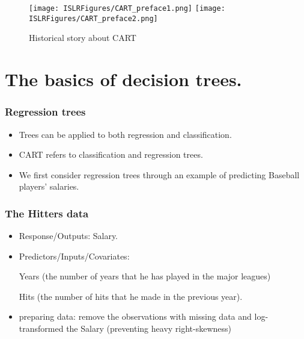 \documentclass{beamer}
\begin{document}
                \begin{frame}{}

                    \begin{figure}
              \centering
                \texttt{[image: ISLRFigures/CART\_preface1.png]}\quad
                \texttt{[image: ISLRFigures/CART\_preface2.png]}
              \caption{Historical story about CART}
            \end{figure}

        \end{frame}
        
\section{The basics of decision trees.}        
       \begin{frame}
       	\frametitle{Regression trees}
       	\begin{itemize}
       		\item Trees can be applied to both regression and classification.
       		\item CART refers to classification and regression trees.
       		\item We first consider regression trees through an example of predicting 
       		Baseball players' salaries.	
       	\end{itemize}
       \end{frame} 
       
            \begin{frame}
            	\frametitle{The Hitters data}
            	\begin{itemize}
            		\item Response/Outputs: Salary.
            	 
            		\item Predictors/Inputs/Covariates:
            		
            		Years (the number of years that he has played in the major leagues) 
            		
            		Hits (the number of hits that he made in the previous year).
            		
            		\item preparing data: remove the observations with missing data and 
            	 log-transformed the Salary (preventing heavy right-skewness)
            		
            	\end{itemize}
            \end{frame} 
            
\end{document}
